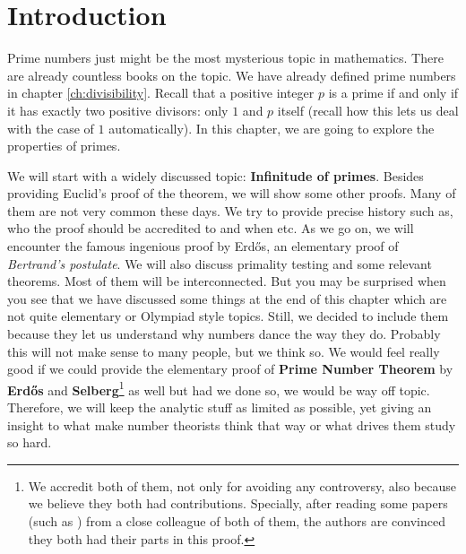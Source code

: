 \documentclass{subfiles}
\begin{document}
	\section{Introduction}
	Prime numbers just might be the most mysterious topic in mathematics. There are already countless books on the topic. We have already defined prime numbers in chapter \eqref{ch:divisibility}. Recall that a positive integer $p$ is a prime if and only if it has exactly two positive divisors: only $1$ and $p$ itself (recall how this lets us deal with the case of $1$ automatically). In this chapter, we are going to explore the properties of primes.
	
	We will start with a widely discussed topic: \textbf{Infinitude of primes}. Besides providing Euclid's proof of the theorem, we will show some other proofs. Many of them are not very common these days. We try to provide precise history such as, who the proof should be accredited to and when etc. As we go on, we will encounter the famous ingenious proof by Erd\H{o}s, an elementary proof of \textit{Bertrand's postulate}. We will also discuss primality testing and some relevant theorems. Most of them will be interconnected. But you may be surprised when you see that we have discussed some things at the end of this chapter which are not quite elementary or Olympiad style topics. Still, we decided to include them because they let us understand why numbers dance the way they do. Probably this will not make sense to many people, but we think so. We would feel really good if we could provide the elementary proof of \textbf{Prime Number Theorem} by \textbf{Erd\H{o}s} and \textbf{Selberg}\footnote{We accredit both of them, not only for avoiding any controversy, also because we believe they both had contributions. Specially, after reading some papers (such as \cite{baas}) from a close colleague of both of them, the authors are convinced they both had their parts in this proof.} as well but had we done so, we would be way off topic. Therefore, we will keep the analytic stuff as limited as possible, yet giving an insight to what make number theorists think that way or what drives them study so hard.
	
\end{document}
